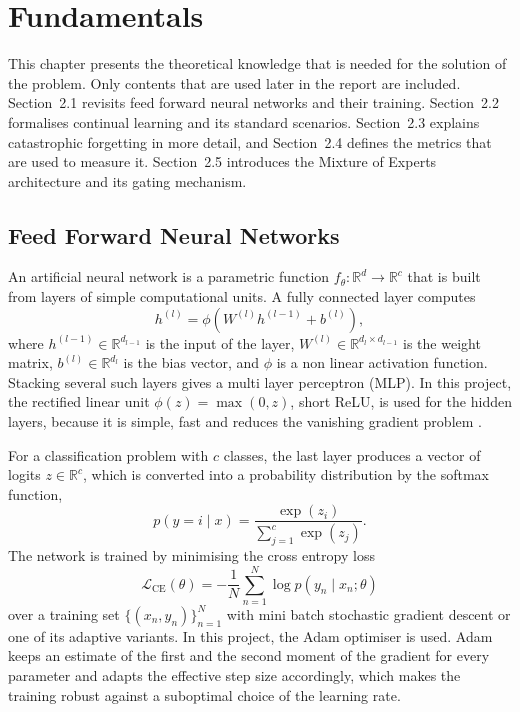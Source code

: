 \chapter{Fundamentals}
\label{chap:fundamentals}

This chapter presents the theoretical knowledge that is needed for the
solution of the problem. Only contents that are used later in the report
are included. Section~2.1 revisits feed forward neural networks and their
training. Section~2.2 formalises continual learning and its standard
scenarios. Section~2.3 explains catastrophic forgetting in more detail, and
Section~2.4 defines the metrics that are used to measure it. Section~2.5
introduces the Mixture of Experts architecture and its gating mechanism.

\section{Feed Forward Neural Networks}
\label{sec:fnn}

An artificial neural network is a parametric function
$f_{\theta} : \mathbb{R}^{d} \rightarrow \mathbb{R}^{c}$ that is built from
layers of simple computational units. A fully connected layer computes
\begin{equation}
  h^{(l)} = \phi\!\left(W^{(l)} h^{(l-1)} + b^{(l)}\right),
  \label{eq:layer}
\end{equation}
where $h^{(l-1)} \in \mathbb{R}^{d_{l-1}}$ is the input of the layer,
$W^{(l)} \in \mathbb{R}^{d_l \times d_{l-1}}$ is the weight matrix,
$b^{(l)} \in \mathbb{R}^{d_l}$ is the bias vector, and $\phi$ is a non
linear activation function. Stacking several such layers gives a multi
layer perceptron (MLP). In this project, the rectified linear unit
$\phi(z) = \max(0, z)$, short ReLU, is used for the hidden layers, because
it is simple, fast and reduces the vanishing gradient problem
\cite{goodfellow2016}.

For a classification problem with $c$ classes, the last layer produces a
vector of logits $z \in \mathbb{R}^{c}$, which is converted into a
probability distribution by the softmax function,
\begin{equation}
  p(y = i \mid x) = \frac{\exp(z_i)}{\sum_{j=1}^{c} \exp(z_j)}.
  \label{eq:softmax}
\end{equation}
The network is trained by minimising the cross entropy loss
\begin{equation}
  \mathcal{L}_{\mathrm{CE}}(\theta)
    = -\frac{1}{N} \sum_{n=1}^{N} \log p(y_n \mid x_n; \theta)
  \label{eq:ce}
\end{equation}
over a training set $\{(x_n, y_n)\}_{n=1}^{N}$ with mini batch stochastic
gradient descent or one of its adaptive variants. In this project, the Adam
optimiser \cite{kingma2015} is used. Adam keeps an estimate of the first
and the second moment of the gradient for every parameter and adapts the
effective step size accordingly, which makes the training robust against a
suboptimal choice of the learning rate.

